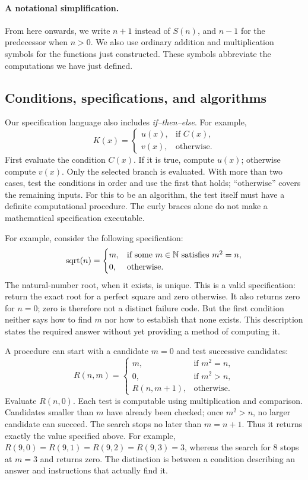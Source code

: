 \paragraph{A notational simplification.}
From here onwards, we write $n+1$ instead of $S(n)$, and $n-1$ for the
predecessor when $n>0$. We also use ordinary addition and multiplication
symbols for the functions just constructed. These symbols abbreviate the computations we have just defined.

\subsection{Conditions, specifications, and algorithms}

Our specification language also includes \emph{if--then--else}. For example,
\[
K(x)=\begin{cases}
u(x),&\text{if }C(x),\\
v(x),&\text{otherwise}.
\end{cases}
\]
First evaluate the condition $C(x)$. If it is true, compute $u(x)$;
otherwise compute $v(x)$. Only the selected branch is evaluated. With more
than two cases, test the conditions in order and use the first that holds;
``otherwise'' covers the remaining inputs. For this to be an algorithm,
the test itself must have a definite computational procedure. The curly
braces alone do not make a mathematical specification executable.

For example, consider the following specification:
\[
\operatorname{sqrt}(n)=\begin{cases}
m,&\text{if some }m\in\mathbb{N}\text{ satisfies }m^2=n,\\
0,&\text{otherwise}.
\end{cases}
\]
The natural-number root, when it exists, is unique. This is a valid
specification: return the exact root for a perfect square and zero otherwise.
It also returns zero for $n=0$; zero is therefore not a distinct failure code.
But the first condition neither says how to find $m$ nor how to establish
that none exists. This description states the required answer without yet
providing a method of computing it.

A procedure can start with a candidate $m=0$ and test successive candidates:
\[
R(n,m)=\begin{cases}
m,&\text{if }m^2=n,\\
0,&\text{if }m^2>n,\\
R(n,m+1),&\text{otherwise}.
\end{cases}
\]
Evaluate $R(n,0)$. Each test is computable using multiplication and comparison.
Candidates smaller than $m$ have already been checked; once $m^2>n$, no
larger candidate can succeed. The search stops no later than $m=n+1$.
Thus it returns exactly the value specified above. For example,
$R(9,0)=R(9,1)=R(9,2)=R(9,3)=3$, whereas the search for $8$ stops at
$m=3$ and returns zero. The distinction is between a condition describing
an answer and instructions that actually find it.

